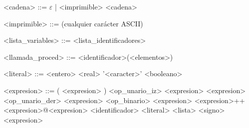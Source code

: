 \documentclass{scrartcl}
\begin{document}
\begin{grammar}
<cadena> ::= $\varepsilon$ | <imprimible> <cadena>

<imprimible> ::= (cualquier carácter ASCII)

<lista_variables> ::= <lista_identificadores>

<llamada_proced> ::= <identificador>(<elementos>)

<literal> ::= <entero> 
\alt <real> 
\alt '<caracter>' 
\alt <booleano> 

<expresion> ::= ( <expresion> )
\alt <op_unario_iz> <expresion>
\alt <expresion> <op_unario_der>
\alt <expresion> <op_binario> <expresion>
\alt <expresion>++<expresion>@<expresion>
\alt <identificador>
\alt <literal>
\alt <lista>
\alt <signo> <expresion>

\end{grammar}
\end{document}
